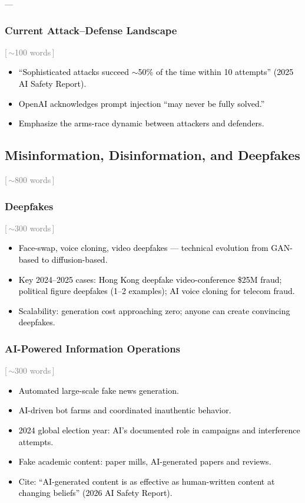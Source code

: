 ––\documentclass[preprint,12pt]{elsarticle}
\newcommand{\wordcount}[1]{\hfill\textcolor{gray}{\small[\,#1\,]}}
\newcommand{\outline}[1]{\textcolor{black}{#1}}
\begin{document}
\subsubsection{Current Attack--Defense Landscape} \wordcount{$\sim$100 words}

\outline{%
\begin{itemize}[nosep,leftmargin=1.5em]
    \item ``Sophisticated attacks succeed $\sim$50\% of the time within 10 attempts'' (2025 AI Safety Report).
    \item OpenAI acknowledges prompt injection ``may never be fully solved.''
    \item Emphasize the arms-race dynamic between attackers and defenders.
\end{itemize}
}


\subsection{Misinformation, Disinformation, and Deepfakes} \wordcount{$\sim$800 words}
\label{sec:threat-misinfo}

\subsubsection{Deepfakes} \wordcount{$\sim$300 words}

\outline{%
\begin{itemize}[nosep,leftmargin=1.5em]
    \item Face-swap, voice cloning, video deepfakes --- technical evolution from GAN-based to diffusion-based.
    \item Key 2024--2025 cases: Hong Kong deepfake video-conference \$25M fraud; political figure deepfakes (1--2 examples); AI voice cloning for telecom fraud.
    \item Scalability: generation cost approaching zero; anyone can create convincing deepfakes.
\end{itemize}
}

\subsubsection{AI-Powered Information Operations} \wordcount{$\sim$300 words}

\outline{%
\begin{itemize}[nosep,leftmargin=1.5em]
    \item Automated large-scale fake news generation.
    \item AI-driven bot farms and coordinated inauthentic behavior.
    \item 2024 global election year: AI's documented role in campaigns and interference attempts.
    \item Fake academic content: paper mills, AI-generated papers and reviews.
    \item Cite: ``AI-generated content is as effective as human-written content at changing beliefs'' (2026 AI Safety Report).
\end{itemize}
}
\end{document}
